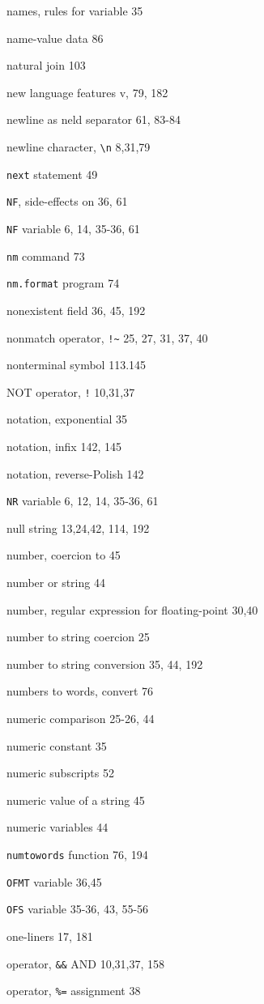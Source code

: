 \begin{multicols}{2}
names, rules for variable 35

name-value data 86

natural join 103

new language features v, 79, 182

newline as neld separator 61,  83-84

newline character, \verb'\n' 8,31,79

\verb'next' statement 49

\verb'NF', side-effects on 36, 61

\verb'NF' variable 6, 14, 35-36, 61

\verb'nm' command 73

\verb'nm.format' program 74


nonexistent field 36, 45, 192

nonmatch operator, \verb'!~' 25, 27, 31, 37, 40

nonterminal symbol 113.145

NOT operator, \verb'!' 10,31,37

notation, exponential 35

notation, infix 142, 145

notation, reverse-Polish 142

\verb'NR' variable 6, 12, 14, 35-36, 61

null string 13,24,42, 114, 192

number, coercion to 45

number or string 44

number, regular expression for floating-point 30,40

number to string coercion 25

number to string conversion 35,  44, 192

numbers to words, convert 76

numeric comparison 25-26, 44

numeric constant 35

numeric subscripts 52

numeric value of a string 45

numeric variables 44

\verb'numtowords' function 76, 194

\verb'OFMT' variable 36,45

\verb'OFS' variable 35-36, 43, 55-56

one-liners 17, 181

operator, \verb'&&' AND 10,31,37, 158

operator, \verb'%=' assignment 38


\end{multicols}
